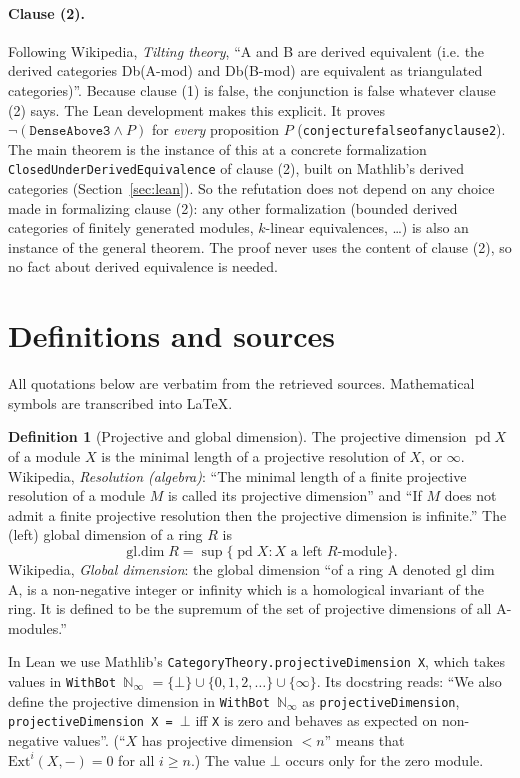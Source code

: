 \documentclass[11pt]{article}
\theoremstyle{definition}
\newtheorem{definition}[theorem]{Definition}
\theoremstyle{remark}
\renewcommand{\_}{\oldus\allowbreak}
\newcommand{\gldim}{\operatorname{gl.dim}}
\newcommand{\pd}{\operatorname{pd}}
\begin{document}
\paragraph{Clause (2).} Following Wikipedia, \emph{Tilting theory}, ``A and B are derived equivalent
(i.e. the derived categories Db(A-mod) and Db(B-mod) are equivalent as triangulated categories)''.
Because clause (1) is false, the conjunction is false whatever clause (2) says. The Lean development
makes this explicit. It proves $\neg(\texttt{DenseAbove3}\wedge P)$ for \emph{every} proposition $P$
(\texttt{conjecture\_00000004042\_false\_of\_any\_clause2}). The main theorem is the instance of this
at a concrete formalization \texttt{ClosedUnderDerivedEquivalence} of clause (2), built on Mathlib's
derived categories (Section~\ref{sec:lean}). So the refutation does not depend on any choice made in
formalizing clause (2): any other formalization (bounded derived categories of finitely generated
modules, $k$-linear equivalences, \dots) is also an instance of the general theorem. The proof never
uses the content of clause (2), so no fact about derived equivalence is needed.

\section{Definitions and sources}

All quotations below are verbatim from the retrieved sources. Mathematical symbols are transcribed
into \LaTeX.

\begin{definition}[Projective and global dimension]\label{def:gldim}
The projective dimension $\pd X$ of a module $X$ is the minimal length of a projective resolution of
$X$, or $\infty$. Wikipedia, \emph{Resolution (algebra)}: ``The minimal length of a finite projective
resolution of a module $M$ is called its projective dimension'' and ``If $M$ does not admit a finite
projective resolution then the projective dimension is infinite.'' The (left) global dimension of a ring
$R$ is
\[
  \gldim R = \sup\{\pd X : X \text{ a left } R\text{-module}\}.
\]
Wikipedia, \emph{Global dimension}: the global dimension ``of a ring A denoted gl dim A, is a non-negative
integer or infinity which is a homological invariant of the ring. It is defined to be the supremum of
the set of projective dimensions of all A-modules.''
\end{definition}

In Lean we use Mathlib's \texttt{CategoryTheory.projectiveDimension X}, which takes values in
\texttt{WithBot $\mathbb{N}_\infty$} $= \{\bot\}\cup\{0,1,2,\dots\}\cup\{\infty\}$. Its docstring
reads: ``We also define the projective dimension in \texttt{WithBot $\mathbb{N}_\infty$} as
\texttt{projectiveDimension}, \texttt{projectiveDimension X = $\bot$} iff \texttt{X} is zero and behaves
as expected on non-negative values''. (``$X$ has projective dimension $< n$'' means that
$\mathrm{Ext}^i(X,-)=0$ for all $i \ge n$.) The value $\bot$ occurs only for the zero module.
\end{document}
